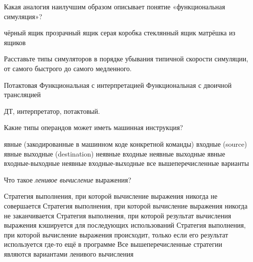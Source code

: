 \documentclass[a4paper, addpoints]{exam}
\begin{document}
\begin{questions}


\question[4] Какая аналогия наилучшим образом описывает понятие «функциональная симуляция»?
\begin{choices}
\correctchoice чёрный ящик
\choice прозрачный ящик
\choice серая коробка
\choice стеклянный ящик
\choice матрёшка из ящиков
\end{choices}

\question[4] Расставьте типы симуляторов в порядке убывания типичной скорости симуляции, от самого быстрого до самого медленного.
\begin{choices}
\choice Потактовая
\choice Функциональная с интерпретацией
\choice Функциональная с двоичной трансляцией
\end{choices}
\begin{solution}
    ДТ, интерпретатор, потактовый.
\end{solution}


\question[4] Какие типы операндов может иметь машинная инструкция?
\begin{choices}
\choice явные (закодированные в машинном коде конкретной команды) входные (source)
\choice явные выходные (destination)
\choice неявные входные
\choice неявные выходные
\choice явные входные-выходные
\choice неявные входные-выходные
\correctchoice все вышеперечисленные варианты
\end{choices}

\question[4] Что такое \textit{ленивое вычисление} выражения?
\begin{choices}
\choice Стратегия выполнения, при которой вычисление выражения никогда не совершается
\choice Стратегия выполнения, при которой вычисление выражения никогда не заканчивается
\choice Стратегия выполнения, при которой результат вычисления выражения кэшируется для последующих использований
\correctchoice Стратегия выполнения, при которой вычисление выражения происходит, только если его результат используется где-то ещё в программе
\choice Все вышеперечисленные стратегии являются вариантами ленивого вычисления
\end{choices}



\newpage
\phantom{Blank page}

\end{questions}
\end{document}
